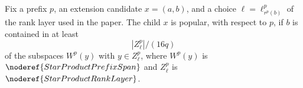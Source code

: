 \begin{definition}
Fix a prefix \(p\), an extension candidate \(x=(a,b)\), and a choice
\(\ell=\ell^p_{r^p(b)}\) of the rank layer used in the paper.  The child
\(x\) is popular, with respect to \(p\), if \(b\) is contained in at least
\[
  |Z_\ell^p|/(16q)
\]
of the subspaces \(W^p(y)\) with \(y\in Z_\ell^p\), where
\(W^p(y)\) is \(\noderef{StarProductPrefixSpan}\) and
\(Z_\ell^p\) is \(\noderef{StarProductRankLayer}\).
\end{definition}
